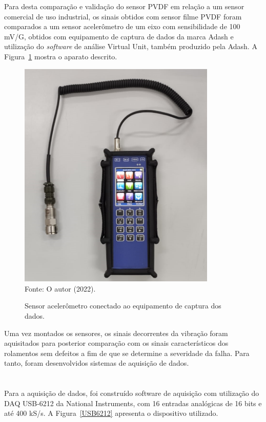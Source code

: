 \documentclass[
	12pt,				
	oneside,			
	a4paper,			
	english,			
	brazil,			
	]{abntex2ppgsi}
\begin{document}
Para desta comparação e validação do sensor PVDF em relação a um sensor comercial de uso industrial, os sinais obtidos com sensor filme PVDF foram comparados a um sensor acelerômetro de um eixo com sensibilidade de 100 mV/G, obtidos com equipamento de captura de dados da marca Adash e utilização do \textit{software} de análise Virtual Unit, também produzido pela Adash. A Figura~\ref{adash} mostra o aparato descrito.

\begin{figure}[H]
\centering
\caption {Sensor acelerômetro conectado ao equipamento de captura dos dados.}
\includegraphics[width=\textwidth,height=110mm,keepaspectratio]{adash} \\
Fonte: O autor (2022).
\label{adash}
\end{figure} 


Uma vez montados os sensores, os sinais decorrentes da vibração foram aquisitados para posterior comparação com os sinais característicos dos rolamentos sem defeitos a fim de que se determine a severidade da falha. Para tanto, foram desenvolvidos sistemas de aquisição de dados. 

\section{}

Para a aquisição de dados, foi construído software de aquisição com utilização do DAQ USB-6212 da National Instruments, com 16 entradas analógicas de 16 bits e até 400 kS/s. A Figura~\ref{USB6212} apresenta o dispositivo utilizado.
\end{document}
